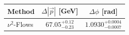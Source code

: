     \begin{tabular}{lcc}
        \toprule
        Method & $\Delta |\vec p|$ [GeV] & $\Delta \phi$ [rad] \\
        \midrule
        $\nu^2$-Flows & $67.05^{+0.12}_{-0.23}$ & $1.0930^{+0.0004}_{-0.0007}$ \\
        \bottomrule
    \end{tabular}